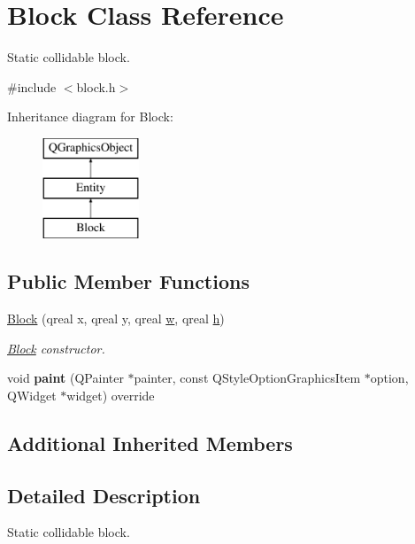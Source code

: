 \hypertarget{class_block}{}\section{Block Class Reference}
\label{class_block}


Static collidable block.  




{\ttfamily \#include $<$block.\+h$>$}

Inheritance diagram for Block\+:\begin{figure}[H]
\begin{center}
\leavevmode
\includegraphics[height=3.000000cm]{class_block}
\end{center}
\end{figure}
\subsection*{Public Member Functions}
\begin{DoxyCompactItemize}
\item 
\hyperlink{class_block_aec663ac44747300bb04a68bdaf911cf8}{Block} (qreal x, qreal y, qreal \hyperlink{class_entity_a351a26475f8c124429a638483e95fa8e}{w}, qreal \hyperlink{class_entity_a639fea375adab80851778acb51757fb8}{h})
\begin{DoxyCompactList}\small\item\em \hyperlink{class_block}{Block} constructor. \end{DoxyCompactList}\item 
\mbox{\label{class_block_aa199c6680537a305ff28c5997325883d}} 
void {\bfseries paint} (Q\+Painter $\ast$painter, const Q\+Style\+Option\+Graphics\+Item $\ast$option, Q\+Widget $\ast$widget) override
\end{DoxyCompactItemize}
\subsection*{Additional Inherited Members}


\subsection{Detailed Description}
Static collidable block. 

